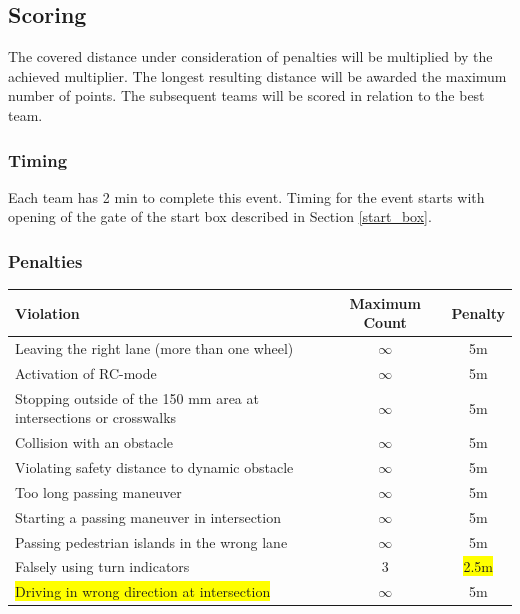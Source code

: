 \documentclass[a4paper]{report}
\begin{document}
{{{\subsection{Scoring}
\label{obstacle_scoring}

The covered distance under consideration of penalties will be multiplied by the achieved multiplier. The longest resulting distance will be awarded the maximum number of points. The subsequent teams will be scored in relation to the best team. 

\subsubsection{Timing} 

Each team has 2 min to complete this event. Timing for the event starts with opening of the gate of the start box described in Section \ref{start_box}. 

\subsubsection{Penalties} 

\begin{table}[H]
\begin{tabular}{@{}lcc@{}}
\toprule
\textbf{Violation}                                                 & \textbf{Maximum Count} & \textbf{Penalty}\\ \midrule
Leaving the right lane (more than one wheel)                       & $\infty$               & 5m               \\
Activation of RC-mode                                              & $\infty$               & 5m               \\
Stopping outside of the 150 mm area at intersections or crosswalks & $\infty$               & 5m               \\
Collision with an obstacle                                         & $\infty$               & 5m               \\
Violating safety distance to dynamic obstacle                      & $\infty$               & 5m               \\
Too long passing maneuver                                          & $\infty$               & 5m               \\
Starting a passing maneuver in intersection                        & $\infty$               & 5m               \\
Passing pedestrian islands in the wrong lane                       & $\infty$               & 5m               \\
Falsely using turn indicators                                      & 3                      & \colorbox{yellow}{2.5m}                \\
\colorbox{yellow}{Driving in wrong direction at intersection}      & $\infty$               & 5m               \\ \bottomrule
\end{tabular}
\end{table}

}}}
\end{document}
